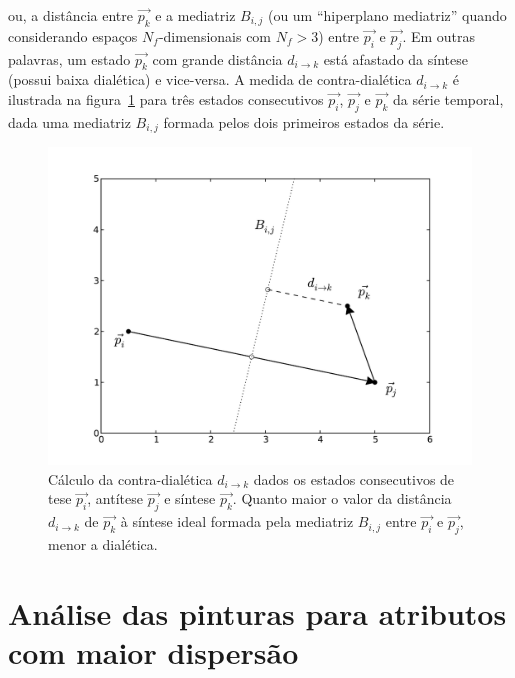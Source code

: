 \noindent ou, a distância entre $\vec{p_k}$ e a mediatriz $B_{i,j}$
(ou um ``hiperplano mediatriz'' quando considerando espaços
$N_f$-dimensionais com $N_f>3$) entre $\vec{p_i}$ e $\vec{p_j}$. Em
outras palavras, um estado $\vec{p_k}$ com grande distância $d_{i
  \rightarrow k}$ está afastado da síntese (possui baixa dialética) e
vice-versa. A medida de contra-dialética $d_{i \rightarrow k}$ é
ilustrada na figura~\ref{fig:desc_dialetica} para três estados
consecutivos $\vec{p_i}$, $\vec{p_j}$ e $\vec{p_k}$ da série temporal,
dada uma mediatriz $B_{i,j}$ formada pelos dois primeiros estados da
série.

\begin{figure}[ht!]
\begin{center}
      \caption{Cálculo da contra-dialética $d_{i \rightarrow k}$ dados os
        estados consecutivos de tese $\vec{p_i}$, antítese $\vec{p_j}$ e síntese
        $\vec{p_k}$. Quanto maior o valor da distância $d_{i \rightarrow k}$ de
        $\vec{p_k}$ à síntese ideal formada pela mediatriz $B_{i,j}$ entre
        $\vec{p_i}$ e $\vec{p_j}$, menor a dialética.  }
        \label{fig:desc_dialetica}
        \includegraphics[scale=.6]{figs/desc_dialetica.pdf}
      \fonteminha
\end{center}
\end{figure}

\clearpage
\section{Análise das pinturas para atributos com maior dispersão}
\label{sec:pares}

